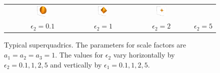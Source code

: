 \begin{figure}[htb]
\begin{tabular}{ccccc}
    & \includegraphics[width=0.2\textwidth]{../images/form_factor/supershapes/superquadric111_5_1.png}
    & \includegraphics[width=0.2\textwidth]{../images/form_factor/supershapes/superquadric111_5_2.png}
    & \includegraphics[width=0.2\textwidth]{../images/form_factor/supershapes/superquadric111_5_5.png} \\
  & $\epsilon_2=0.1$ & $\epsilon_2=1$ & $\epsilon_2=2$ & $\epsilon_2=5$
\end{tabular}
\caption{Typical superquadrics. The parameters for scale factors are $a_1 = a_2 = a_3 = 1 $. The values for $\epsilon_2$ vary horizontally by $\epsilon_2=0.1, 1,2,5$ and vertically by $\epsilon_1=0.1, 1,2,5$.}
\label{fig:opo_superquadrics}
\end{figure}

